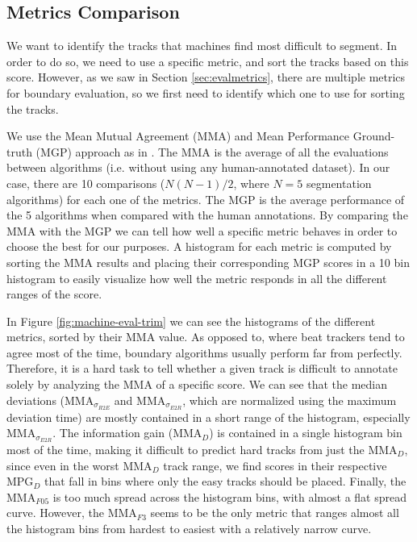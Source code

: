 \documentclass{article}
\begin{document}
\subsection{Metrics Comparison}

We want to identify the tracks that machines find most difficult to segment.
In order to do so, we need to use a specific metric, and sort the tracks based on this score.
However, as we saw in Section \ref{sec:evalmetrics}, there are multiple metrics for boundary evaluation, so we first need to identify which one to use for sorting the tracks.

We use the Mean Mutual Agreement (MMA) and Mean Performance Ground-truth (MGP) approach as in \cite{Holzapfel2012}.
The MMA is the average of all the evaluations between algorithms (i.e. without using any human-annotated dataset).
In our case, there are 10 comparisons ($N(N-1)/2$, where $N=5$ segmentation algorithms) for each one of the metrics.
The MGP is the average performance of the 5 algorithms when compared with the human annotations.
By comparing the MMA with the MGP we can tell how well a specific metric behaves in order to choose the best for our purposes.
A histogram for each metric is computed by sorting the MMA results and placing their corresponding MGP scores in a 10 bin histogram to easily visualize how well the metric responds in all the different ranges of the score.

In Figure \ref{fig:machine-eval-trim} we can see the histograms of the different metrics, sorted by their MMA value.
As opposed to\cite{Holzapfel2012}, where beat trackers tend to agree most of the time, boundary algorithms usually perform far from perfectly.
Therefore, it is a hard task to tell whether a given track is difficult to annotate solely by analyzing the MMA of a specific score.
We can see that the median deviations (MMA$_{\sigma_{R2E}}$ and MMA$_{\sigma_{E2R}}$, which are normalized using the maximum deviation time) are mostly contained in a short range of the histogram, especially MMA$_{\sigma_{E2R}}$.
The information gain (MMA$_D$) is contained in a single histogram bin most of the time, making it difficult to predict hard tracks from just the MMA$_D$, since even in the worst MMA$_D$ track range, we find scores in their respective MPG$_D$ that fall in bins where only the easy tracks should be placed.
Finally, the MMA$_{F05}$ is too much spread across the histogram bins, with almost a flat spread curve.
However, the MMA$_{F3}$ seems to be the only metric that ranges almost all the histogram bins from hardest to easiest with a relatively narrow curve.
\end{document}
